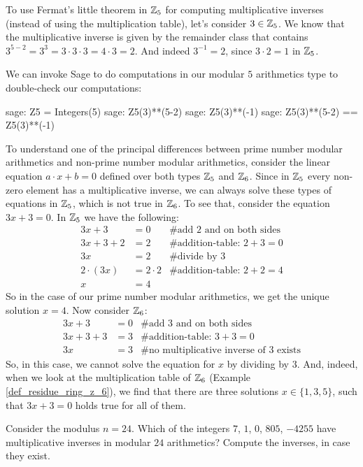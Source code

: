 \begin{example} 
To use Fermat's little theorem in $\mathbb{Z}_5$ for computing multiplicative inverses (instead of using the multiplication table), let's consider $3\in\mathbb{Z}_5$. We know that the multiplicative inverse is given by the remainder class that contains $3^{5-2}=3^3=3\cdot 3\cdot 3= 4\cdot 3 = 2$. And indeed $3^{-1}=2$, since $3\cdot 2 =1$ in $\mathbb{Z}_5$.

We can invoke Sage to do computations in our modular $5$ arithmetics type to double-check our computations:
\begin{sagecommandline}
sage: Z5 = Integers(5)
sage: Z5(3)**(5-2)
sage: Z5(3)**(-1)
sage: Z5(3)**(5-2) == Z5(3)**(-1)
\end{sagecommandline}
\end{example}
\begin{example}
To understand one of the principal differences between prime number modular arithmetics and non-prime number modular arithmetics, consider the linear equation $a\cdot x +b=0$ defined over both types $\mathbb{Z}_5$ and $\mathbb{Z}_6$. Since in $\mathbb{Z}_5$ every non-zero element has a multiplicative inverse, we can always solve these types of equations in $\mathbb{Z}_5$, which is not true in $\mathbb{Z}_6$. To see that, consider the equation $3x+3=0$. In $\mathbb{Z}_5$ we have the following:
\begin{align*}
3x+3    &= 0 & \text{\# add 2 and on both sides} \\
3x+3+2  &= 2 & \text{\# addition-table: } 2+3 = 0 \\
3x      &= 2 & \text{\# divide by } 3 \\
2\cdot(3x)      &= 2\cdot 2 & \text{\# addition-table: } 2+2=4 \\
 x      &= 4 & 
\end{align*}
So in the case of our prime number modular arithmetics, we get the unique solution $x=4$. Now consider $\mathbb{Z}_6$:
\begin{align*}
3x+3    &= 0 & \text{\# add 3 and on both sides} \\
3x+3+3  &= 3 & \text{\# addition-table: } 3+3 = 0 \\
3x      &= 3 & \text{\# no multiplicative inverse of 3  exists}
\end{align*}
So, in this case, we cannot solve the equation for $x$ by dividing by $3$. And, indeed, when we look at the multiplication table of $\mathbb{Z}_6$ (Example \ref{def_residue_ring_z_6}), we find that there are three solutions $x\in\{1,3,5\}$, such that $3x+3=0$ holds true for all of them.
\end{example}
\begin{exercise}
Consider the modulus $n=24$. Which of the integers $7$, $1$, $0$, $805$, $-4255$ have multiplicative inverses in modular $24$ arithmetics? Compute the inverses, in case they exist.
\end{exercise}
